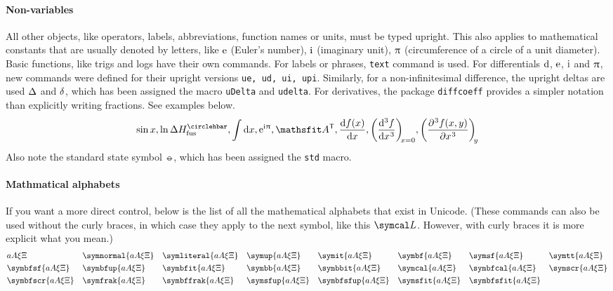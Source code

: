 \documentclass[11pt]{article}
\begin{document}
\paragraph{Non-variables} All other objects, like operators, labels, abbreviations, function names or units, must be typed upright. This also applies to mathematical constants that are usually denoted by letters, like $\mathrm{e}$ (Euler's number), $\mathrm{i}$ (imaginary unit), $\uppi$ (circumference of a circle of a unit diameter). Basic functions, like trigs and logs have their own commands. For labels or phrases, \texttt{text} command is used. For differentials $\mathrm{d}$, $\mathrm{e}$, $\mathrm{i}$ and $\uppi$, new commands were defined for their upright versions \texttt{ue, ud, ui, upi}. Similarly, for a non-infinitesimal difference, the upright deltas are used $\Delta$ and $\delta$, which has been assigned the macro \texttt{uDelta} and \texttt{udelta}. For derivatives, the package \texttt{diffcoeff} provides a simpler notation than explicitly writing fractions. See examples below.
\[
\sin x, \ln \uDelta H_\text{fus}^\std,\int \ud x, \ue^{\ui \upi}, \mat{A}^\transp, \diff{f(x)}{x}, \diff[3]{f}{x}[x=0], \diffp[3]{f(x,y)}{x}[y]
\]
Also note the standard state symbol $\circlehbar$, which has been assigned the \texttt{std} macro.

\paragraph{Mathmatical alphabets} If you want a more direct control, below is the list of all the mathematical alphabets that exist in Unicode. (These commands can also be used without the curly braces, in which case they apply to the next symbol, like this $\symcal L$. However, with curly braces it is more explicit what you mean.)
\begin{align*}
    &a A \xi \Xi                &
    &\symnormal{a A \xi \Xi}    &
    &\symliteral{a A \xi \Xi}   &
    &\symup{a A \xi \Xi}    &
    &\symit{a A \xi \Xi}    &
    &\symbf{a A \xi \Xi}   &
    &\symsf{a A \xi \Xi}    &
    &\symtt{a A \xi \Xi}    \\
    &\symbfsf{a A \xi \Xi}   &
    &\symbfup{a A \xi \Xi}   &
    &\symbfit{a A \xi \Xi}   &
    &\symbb{a A \xi \Xi}   &
    &\symbbit{a A \xi \Xi}   &
    &\symcal{a A \xi \Xi}   &
    &\symbfcal{a A \xi \Xi}   &
    &\symscr{a A \xi \Xi}    \\
    &\symbfscr{a A \xi \Xi}   &
    &\symfrak{a A \xi \Xi}   &
    &\symbffrak{a A \xi \Xi}   &
    &\symsfup{a A \xi \Xi}   &
    &\symbfsfup{a A \xi \Xi}    &
    &\symsfit{a A \xi \Xi}    &
    &\symbfsfit{a A \xi \Xi} \\
\end{align*}
\end{document}
